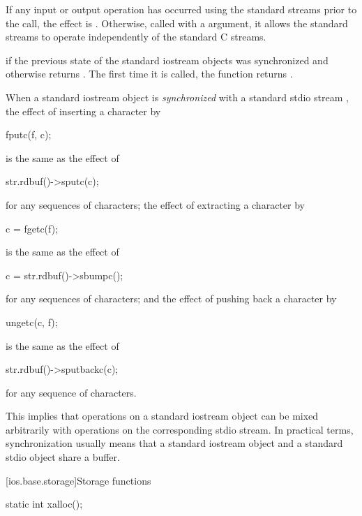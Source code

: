 \begin{itemdescr}
\pnum
\effects
If any input or output operation has occurred using the standard streams prior to the
call, the effect is
.
Otherwise, called with a  argument, it allows the standard streams to
operate independently of the standard C streams.

\pnum
\returns
{}
if the previous state of the standard iostream objects
was synchronized and otherwise returns
.
The first time it is called,
the function returns
.

\pnum
\remarks
When a standard iostream object  is
\textit{synchronized}
with a standard stdio stream , the effect of inserting a character  by
\begin{codeblock}
fputc(f, c);
\end{codeblock}
is the same as the effect of
\begin{codeblock}
str.rdbuf()->sputc(c);
\end{codeblock}
for any sequences of characters; the effect of extracting a character  by
\begin{codeblock}
c = fgetc(f);
\end{codeblock}
is the same as the effect of
\begin{codeblock}
c = str.rdbuf()->sbumpc();
\end{codeblock}
for any sequences of characters; and the effect of pushing back a character  by
\begin{codeblock}
ungetc(c, f);
\end{codeblock}
is the same as the effect of
\begin{codeblock}
str.rdbuf()->sputbackc(c);
\end{codeblock}
for any sequence of characters.
\begin{footnote}
This implies that operations on a standard iostream object can be mixed arbitrarily
with operations on the corresponding stdio stream. In practical terms, synchronization
usually means that a standard iostream object and a standard stdio object share a
buffer.
\end{footnote}
\end{itemdescr}

[ios.base.storage]{Storage functions}

%
\begin{itemdecl}
static int xalloc();
\end{itemdecl}

